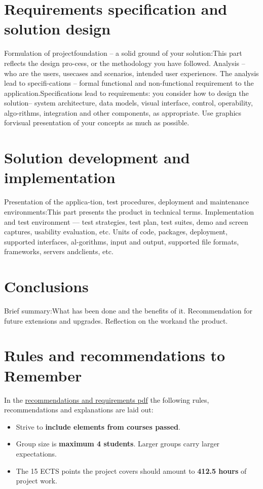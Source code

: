 \documentclass[
english, %
headsepline, %
]{scrartcl} %
\begin{document}
\section{Requirements specification and solution design}
\label{sec:Requirements specification and solution design}
    Formulation of projectfoundation – a solid ground of your solution:This part reflects the design pro-cess, or the methodology you have followed. 
    Analysis – who are the users, usecases  and  scenarios,  intended  user  experiences.  The  analysis  lead  to  specifi-cations – formal functional and 
    non-functional requirement to the application.Specifications  lead  to  requirements:  you  consider  how  to  design  the  solution– system architecture, 
    data models, visual interface, control, operability, algo-rithms,  integration  and  other  components,  as  appropriate. 
    Use  graphics  forvisual presentation of your concepts as much as possible.

\section{Solution development and implementation}
\label{sec:Solution development and implementation}
    Presentation of the applica-tion, test procedures, deployment and maintenance environments:This part presents the product in technical terms. 
    Implementation and test environment — test strategies, test plan, test suites, demo and screen captures, usability evaluation, etc. 
    Units of code, packages, deployment, supported interfaces, al-gorithms,  input  and  output,  supported  file  formats,  frameworks,  servers  andclients, etc.

\section{Conclusions}
\label{sec:Conclusions}
    Brief summary:What  has  been  done  and  the  benefits  of  it. Recommendation for future extensions and upgrades. Reflection on the workand the product.


\section{Rules and recommendations to Remember}
\label{sec:Rules and recommendations to Remember}
    In the \href{https://datsoftlyngby.github.io/soft2020fall/resources/bbe51cf2-bachelorProject.pdf}{recommendations and requirements pdf} the following rules, recommendations and explanations are laid out:
    \begin{itemize}
        \item Strive to \textbf{include elements from courses passed}.
        \item Group size is \textbf{maximum 4 students}. Larger groups carry larger expectations.
        \item The 15 ECTS points the project covers should amount to \textbf{412.5 hours} of project work.
    \end{itemize}
\end{document}
